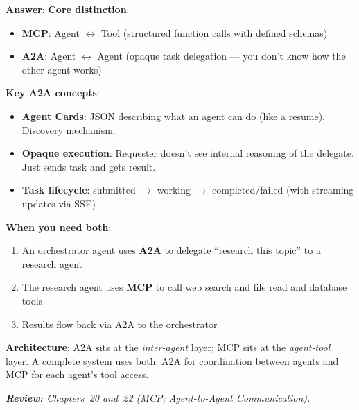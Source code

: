 \begin{questionbox}
\textbf{Answer}: \textbf{Core distinction}:

\begin{itemize}
  \item \textbf{MCP}: Agent $\leftrightarrow$ Tool (structured function calls with defined schemas)
  \item \textbf{A2A}: Agent $\leftrightarrow$ Agent (opaque task delegation --- you don’t know how the other agent works)
\end{itemize}

\textbf{Key A2A concepts}:

\begin{itemize}
  \item \textbf{Agent Cards}: JSON describing what an agent can do (like a resume). Discovery mechanism.
  \item \textbf{Opaque execution}: Requester doesn’t see internal reasoning of the delegate. Just sends task and gets result.
  \item \textbf{Task lifecycle}: submitted $\to$ working $\to$ completed/failed (with streaming updates via SSE)
\end{itemize}

\textbf{When you need both}:

\begin{enumerate}
  \item An orchestrator agent uses \textbf{A2A} to delegate ``research this topic'' to a research agent
  \item The research agent uses \textbf{MCP} to call web search and file read and database tools
  \item Results flow back via A2A to the orchestrator
\end{enumerate}

\textbf{Architecture}: A2A sits at the \emph{inter-agent} layer; MCP sits at the \emph{agent-tool} layer. A complete system uses both: A2A for coordination between agents and MCP for each agent’s tool access.

\emph{\textbf{Review:} Chapters~20 and~22 (MCP; Agent-to-Agent Communication).}
\end{questionbox}


